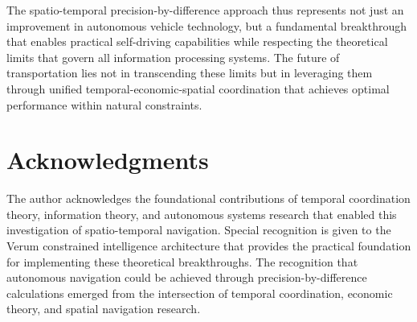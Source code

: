 \documentclass[12pt,a4paper]{article}
\begin{document}
The spatio-temporal precision-by-difference approach thus represents not just an improvement in autonomous vehicle technology, but a fundamental breakthrough that enables practical self-driving capabilities while respecting the theoretical limits that govern all information processing systems. The future of transportation lies not in transcending these limits but in leveraging them through unified temporal-economic-spatial coordination that achieves optimal performance within natural constraints.

\section*{Acknowledgments}

The author acknowledges the foundational contributions of temporal coordination theory, information theory, and autonomous systems research that enabled this investigation of spatio-temporal navigation. Special recognition is given to the Verum constrained intelligence architecture that provides the practical foundation for implementing these theoretical breakthroughs. The recognition that autonomous navigation could be achieved through precision-by-difference calculations emerged from the intersection of temporal coordination, economic theory, and spatial navigation research.


\end{document}
